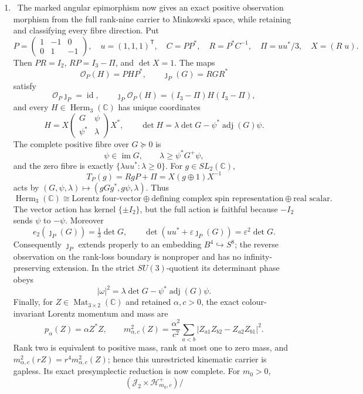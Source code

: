 \begin{enumerate}[leftmargin=1.8em]
\item \Verified\ The marked angular epimorphism now gives an exact positive
observation morphism from the full rank-nine carrier to Minkowski space,
while retaining and classifying every fibre direction.  Put
\[
 P=\begin{pmatrix}1&-1&0\\0&1&-1\end{pmatrix},\quad
 u=(1,1,1)^{\mathsf T},\quad C=PP^*,\quad
 R=P^*C^{-1},\quad \Pi=uu^*/3,\quad X=(R\;u).
\]
Then \(PR=I_2\), \(RP=I_3-\Pi\), and \(\det X=1\).  The maps
\[
 \mathcal O_P(H)=PHP^*,\qquad \jmath_P(G)=RGR^*
\]
satisfy
\[
 \mathcal O_P\jmath_P=\operatorname{id},\qquad
 \jmath_P\mathcal O_P(H)=(I_3-\Pi)H(I_3-\Pi),
\]
and every \(H\in\operatorname{Herm}_3(\mathbb C)\) has unique coordinates
\[
 H=X\begin{pmatrix}G&\psi\\\psi^*&\lambda\end{pmatrix}X^*,\qquad
 \det H=\lambda\det G-\psi^*\operatorname{adj}(G)\psi.
\]
The complete positive fibre over \(G\succeq0\) is
\[
 \psi\in\operatorname{im}G,\qquad
 \lambda\geq\psi^*G^+\psi,
\]
and the zero fibre is exactly \(\{\lambda uu^*: \lambda\geq0\}\).
For \(g\in SL_2(\mathbb C)\),
\[
 T_P(g)=RgP+\Pi=X(g\oplus1)X^{-1}
\]
acts by \((G,\psi,\lambda)\mapsto(gGg^*,g\psi,\lambda)\).  Thus
\[
 \operatorname{Herm}_3(\mathbb C)
 \cong \text{Lorentz four-vector}\oplus
 \text{defining complex spin representation}\oplus\text{real scalar}.
\]
The vector action has kernel \(\{\pm I_2\}\), but the full action is
faithful because \(-I_2\) sends \(\psi\) to \(-\psi\).  Moreover
\[
 e_2(\jmath_P(G))=\tfrac13\det G,\qquad
 \det(uu^*+\varepsilon\jmath_P(G))=\varepsilon^2\det G.
\]
Consequently \(\jmath_P\) extends properly to an embedding
\(B^4\hookrightarrow S^8\); the reverse observation on the rank-loss
boundary is nonproper and has no infinity-preserving extension.  In the
strict \(SU(3)\)-quotient its determinant phase obeys
\[
 |\omega|^2=\lambda\det G-
 \psi^*\operatorname{adj}(G)\psi.
\]
Finally, for \(Z\in\operatorname{Mat}_{3\times2}(\mathbb C)\) and retained
\(\alpha,c>0\), the exact colour-invariant Lorentz momentum and mass are
\[
 p_\alpha(Z)=\alpha Z^*Z,\qquad
 m_{\alpha,c}^2(Z)=\frac{\alpha^2}{c^2}
 \sum_{a<b}|Z_{a1}Z_{b2}-Z_{a2}Z_{b1}|^2.
\]
Rank two is equivalent to positive mass, rank at most one to zero mass, and
\(m_{\alpha,c}^2(rZ)=r^4m_{\alpha,c}^2(Z)\); hence this unrestricted
kinematic carrier is gapless.  Its exact presymplectic reduction is now
complete.  For \(m_0>0\),
\[
 (\mathcal J_2\times\mathcal H^+_{m_0,c})/
\]
\end{enumerate}

